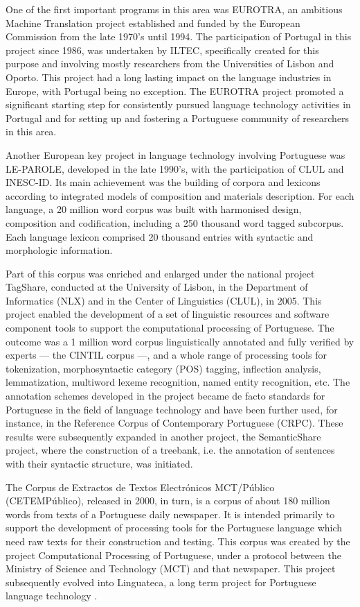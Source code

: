 \begin{multicols}{2}
One of the first important programs in this area was EUROTRA, an ambitious Machine Translation project established and funded by the European Commission from the late 1970's until 1994. The participation of Portugal in this project since 1986, was undertaken by ILTEC, specifically created for this purpose and involving mostly researchers
from the Universities of Lisbon and Oporto. This project had a long lasting impact on the language industries in Europe, with Portugal being no exception. The EUROTRA project promoted a significant starting step for consistently pursued language technology activities in Portugal and for setting up and fostering a Portuguese community of researchers in this area.

Another European key project in language technology involving Portuguese was LE-PAROLE, developed in the late 1990's, with the participation of CLUL and INESC-ID. Its main achievement was the building of corpora and lexicons according to integrated models of composition and materials description. For each language, a 20 million word corpus was built with harmonised design, composition and codification, including a 250 thousand word tagged subcorpus. Each language lexicon comprised 20 thousand entries with syntactic and morphologic information.

Part of this corpus was enriched and enlarged under the national project TagShare, conducted at the University of Lisbon, in the Department of Informatics (NLX) and in the Center of Linguistics (CLUL), in 2005. This project enabled the development of a set of linguistic resources and software component tools to support the computational processing of Portuguese. The outcome was a 1 million word corpus linguistically annotated and fully verified by experts --- the CINTIL corpus \cite{cintil} ---, and a whole range of processing tools for tokenization, morphosyntactic category (POS) tagging, inflection analysis, lemmatization, multiword lexeme recognition, named entity recognition, etc. The annotation schemes developed in the project became de facto standards for Portuguese in the field of language technology and have been further used, for instance, in the Reference Corpus of Contemporary Portuguese (CRPC). These results were subsequently expanded in another project,
the SemanticShare project, where the construction of a treebank, i.e. the annotation of sentences with their
syntactic structure, was initiated.

The Corpus de Extractos de Textos Electrónicos MCT/Público (CETEMPúblico), released in 2000, in turn, is a corpus of about 180 million words from texts of a Portuguese daily newspaper. It is intended primarily to support the development of processing tools for the Portuguese language which need raw texts for their construction and testing. This corpus was created by the project Computational Processing of Portuguese, under a protocol between the Ministry of Science and Technology (MCT) and that newspaper. This project subsequently evolved into Linguateca, a long term project for Portuguese language technology \cite{linguateca}.


\end{multicols}
